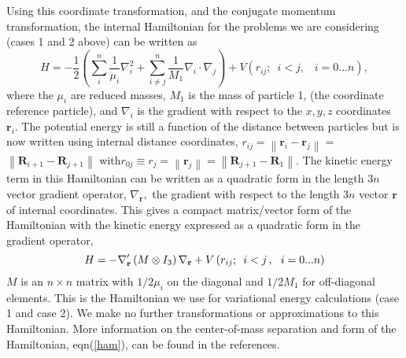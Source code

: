 \documentclass[12pt,thmsa]{article}
\begin{document}
Using this coordinate transformation, and the conjugate momentum
transformation, the internal Hamiltonian for the problems we are considering
(cases 1 and 2 above) can be written as 
\begin{equation}
H=-\frac 12\left( \sum_i^n\frac 1{\mu _i}\nabla _i^2+\sum_{i\neq j}^n\frac
1{M_1}\nabla _i\cdot \nabla _j\right) +V\left(
r_{ij};\,\,\,i<j,\,\,\,\,\,i=0...n\right) ,  \label{intham1}
\end{equation}
where the $\mu _i$ are reduced masses, $M_1$ is the mass of particle 1, (the
coordinate reference particle), and $\nabla _i$ is the gradient with respect
to the $x,y,z$ coordinates $\mathbf{r}_i$. The potential energy is still a
function of the distance between particles but is now written using internal
distance coordinates, $r_{ij}=\left\| \mathbf{r}_i-\mathbf{r}_j\right\| =$ $%
\left\| \mathbf{R}_{i+1}-\mathbf{R}_{j+1}\right\| \,\,$with\thinspace $%
r_{0j}\equiv r_j=\left\| \mathbf{r}_j\right\| =\left\| \mathbf{R}_{j+1}-%
\mathbf{R}_1\right\| .$ The kinetic energy term in this Hamiltonian can be
written as a quadratic form in the length $3n$ vector gradient operator, $%
\nabla _{\mathbf{r}},$ the gradient with respect to the length $3n$ vector $%
\mathbf{r}$ of internal coordinates. This gives a compact matrix/vector form
of the Hamiltonian with the kinetic energy expressed as a quadratic form in
the gradient operator, 
\begin{equation}
H=-\nabla _{\mathbf{r}}^{\prime }\left( M\otimes I_3\right) \nabla _{\mathbf{%
r}}+V\left( r_{ij};\,\,\,i<j\,,\,\,\,\,i=0...n\right)   \label{ham}
\end{equation}
$M$ is an $n\times n$ matrix with $1/2\mu _i$ on the diagonal and $1/2M_1$
for off-diagonal elements. This is the Hamiltonian we use for variational
energy calculations (case 1 and case 2). We make no further transformations
or approximations to this Hamiltonian. More information on the
center-of-mass separation and form of the Hamiltonian, eqn(\ref{ham}), can
be found in the references\cite{Kinghorn93,Kinghorn95b}.
\end{document}
